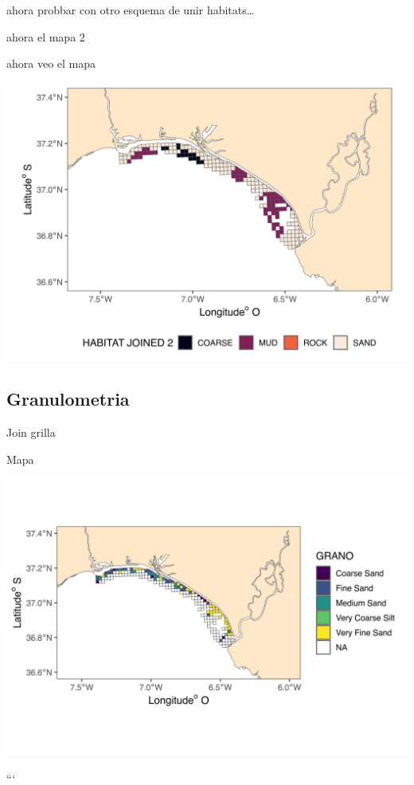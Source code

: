 \documentclass[
]{article}
\begin{document}
ahora probbar con otro esquema de unir habitats\ldots{}

ahora el mapa 2

ahora veo el mapa

\begin{center}\includegraphics{Habitat_files/figure-latex/unnamed-chunk-9-1} \end{center}

\hypertarget{granulometria}{%
\subsection{Granulometria}\label{granulometria}}

Join grilla

Mapa

\begin{center}\includegraphics{Habitat_files/figure-latex/unnamed-chunk-12-1} \end{center}

```
\end{document}
